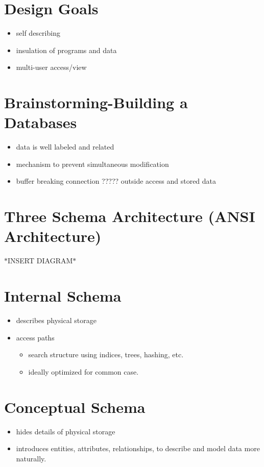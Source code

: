 \documentclass[12pt]{report}
\begin{document}
	\section{Design Goals}
	\begin{itemize}
		\item self describing
		\item insulation of programs and data
		\item multi-user access/view
	\end{itemize}
	\section{Brainstorming-Building a Databases}
	\begin{itemize}
		\item data is well labeled and related
		\item mechanism to prevent simultaneous modification
		\item buffer breaking connection ????? outside access and stored data
	\end{itemize}
	\section{Three Schema Architecture (ANSI Architecture)}
	$\ast$INSERT DIAGRAM$\ast$
	\section{Internal Schema}
	\begin{itemize}
		\item describes physical storage
		\item access paths
		\begin{itemize}
			\item search structure using indices, trees, hashing, etc.
			\item ideally optimized for common case.
		\end{itemize}
	\end{itemize}
	\section{Conceptual Schema}
	\begin{itemize}
		\item hides details of physical storage
		\item introduces entities, attributes, relationships, to describe and model data more naturally.
	\end{itemize}
\end{document}
